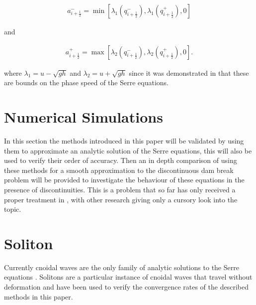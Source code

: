 \documentclass[SingleSpace,12pt,Proceedings]{Serre_ASCE}
\begin{document}
\begin{linenomath*}
\begin{gather*}
a^-_{i+\frac{1}{2}} = \min \left[\lambda_1\left(q^-_{i + \frac{1}{2}}\right), \lambda_1\left(q^+_{i + \frac{1}{2}}\right), 0 \right]
\end{gather*}
\end{linenomath*}
and
\begin{linenomath*}
\begin{gather*}
a^+_{i+\frac{1}{2}} = \max \left[\lambda_2\left(q^-_{i + \frac{1}{2}}\right), \lambda_2\left(q^+_{i + \frac{1}{2}}\right), 0 \right].
\end{gather*}
\end{linenomath*}
where $\lambda_1 = u - \sqrt{gh}$ and $\lambda_2 = u + \sqrt{gh}$ since it was demonstrated in  that these are bounds on the phase speed of the Serre equations.

\section{Numerical Simulations}
\label{section:Numerical Simulations}
In this section the methods introduced in this paper will be validated by using them to approximate an analytic solution of the Serre equations, this will also be used to verify their order of accuracy. Then an in depth comparison of using these methods for a smooth approximation to the discontinuous dam break problem will be provided to investigate the behaviour of these equations in the presence of discontinuities. This is a problem that so far has only received a proper treatment in \cite{El-etal-2006}, with other research giving only a cursory look into the topic. 

\section{Soliton}
\label{section:Convergence Rate}
Currently cnoidal waves are the only family of analytic solutions to the Serre equations \cite{Carter-Cienfuegos-2010-259}. Solitons are a particular instance of cnoidal waves that travel without deformation and have been used to verify the convergence rates of the described methods in this paper. 
\end{document}
